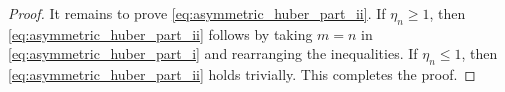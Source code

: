 \documentclass[10pt,a4paper]{amsart}
\begin{document}
\begin{proof}
It remains to prove \eqref{eq:asymmetric_huber_part_ii}.
If $\eta_n\geq 1$, then \eqref{eq:asymmetric_huber_part_ii} follows by taking $m=n$ in \eqref{eq:asymmetric_huber_part_i} and rearranging the inequalities.
If $\eta_n\leq 1$, then \eqref{eq:asymmetric_huber_part_ii} holds trivially.
This completes the proof.
\end{proof}
\end{document}
